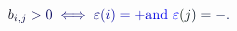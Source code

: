\documentclass[12pt]{article}
\begin{document}
\makeatletter
\renewcommand*{\@textcolor}[3]{%
  \protect\leavevmode
  \begingroup
    \color#1{#2}#3%
  \endgroup
}
\makeatother
\begin{displaymath}
\mathcolor[RGB]{0,0,15}{b} _ { \mathcolor[RGB]{0,0,30}{i} \mathcolor[RGB]{0,0,45}{,} \mathcolor[RGB]{0,0,60}{j} } \mathcolor[RGB]{0,0,75}{>} \mathcolor[RGB]{0,0,90}{0} \mathcolor[RGB]{0,0,105}{\iff} \mathcolor[RGB]{0,0,120}{\varepsilon} \mathcolor[RGB]{0,0,135}{(} \mathcolor[RGB]{0,0,150}{i} \mathcolor[RGB]{0,0,165}{)} \mathcolor[RGB]{0,0,180}{=} \mathcolor[RGB]{0,0,195}{+} \mathrm { \mathcolor[RGB]{0,0,210}{a} \mathcolor[RGB]{0,0,225}{n} \mathcolor[RGB]{0,0,240}{d} ~ } \mathcolor[RGB]{0,0,255}{\varepsilon} \mathcolor[RGB]{0,15,0}{(} \mathcolor[RGB]{0,15,15}{j} \mathcolor[RGB]{0,15,30}{)} \mathcolor[RGB]{0,15,45}{=} \mathcolor[RGB]{0,15,60}{-} \mathcolor[RGB]{0,15,75}{.}
\end{displaymath}
\end{document}
